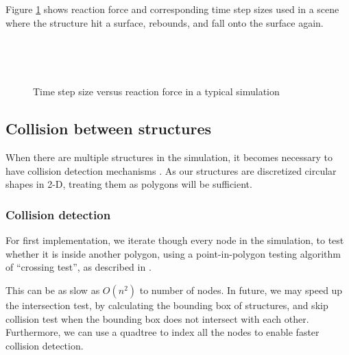 \documentclass[letterpaper,9pt,twocolumn]{extarticle}
\begin{document}
		Figure \ref{ats} shows reaction force and corresponding time step sizes used in a scene where the structure hit a surface, rebounds, and fall onto the surface again.
		\begin{figure}[ht]
			\centering
			\\
			\\
			\caption{Time step size versus reaction force in a typical simulation}
			\label{ats}
		\end{figure}
	\subsection{Collision between structures}
		When there are multiple structures in the simulation, it becomes necessary to have collision detection mechanisms \cite{Moore88}. As our structures are discretized circular shapes in 2-D, treating them as polygons will be sufficient.
		\subsubsection{Collision detection}
			For first implementation, we iterate though every node in the simulation, to test whether it is inside another polygon, using a point-in-polygon testing algorithm of ``crossing test'', as described in \cite{Haines94}.
			
			This can be as slow as $O(n^2)$ to number of nodes. In future, we may speed up the intersection test, by calculating the bounding box of structures, and skip collision test when the bounding box does not intersect with each other. Furthermore, we can use a quadtree to index all the nodes to enable faster collision detection.
			
\end{document}
